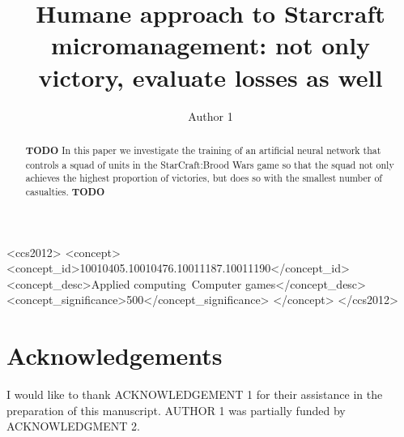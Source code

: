 \documentclass[sigconf, authordraft]{acmart}
\begin{document}
\title{Humane approach to Starcraft micromanagement: not only victory, evaluate losses as well}

\author{Author 1}

\begin{abstract}
  {\bf TODO} In this paper we investigate the training of an
  artificial neural network that controls a squad of units in the
  StarCraft:Brood Wars game so that the squad not only achieves the
  highest proportion of victories, but does so with the smallest
  number of casualties. {\bf TODO}
\end{abstract}

\begin{CCSXML}
<ccs2012>
<concept>
<concept_id>10010405.10010476.10011187.10011190</concept_id>
<concept_desc>Applied computing~Computer games</concept_desc>
<concept_significance>500</concept_significance>
</concept>
</ccs2012>
\end{CCSXML}



\maketitle















\section*{Acknowledgements}

I would like to thank ACKNOWLEDGEMENT 1 for their assistance in the
preparation of this manuscript. AUTHOR 1 was partially funded by
ACKNOWLEDGMENT 2.


{}
\end{document}
